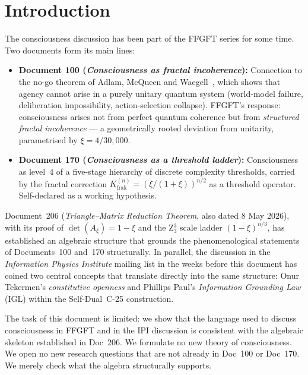 
\section{Introduction}\label{sec:intro}

The consciousness discussion has been part of the FFGFT series for some time. Two documents form its main lines:

\begin{itemize}
\item \textbf{Document 100 (\emph{Consciousness as fractal incoherence}):} Connection to the no-go theorem of Adlam, McQueen and Waegell~\cite{Adlam2025}, which shows that agency cannot arise in a purely unitary quantum system (world-model failure, deliberation impossibility, action-selection collapse). FFGFT's response: consciousness arises not from perfect quantum coherence but from \emph{structured fractal incoherence} --- a geometrically rooted deviation from unitarity, parametrised by $\xi = 4/30{,}000$.
\item \textbf{Document 170 (\emph{Consciousness as a threshold ladder}):} Consciousness as level~4 of a five-stage hierarchy of discrete complexity thresholds, carried by the fractal correction $K_{\text{frak}}^{(n)} = (\xi/(1+\xi))^{n/2}$ as a threshold operator. Self-declared as a working hypothesis.
\end{itemize}

Document~206 (\emph{Triangle--Matrix Reduction Theorem}, also dated 8 May 2026), with its proof of $\det(A_\xi) = 1-\xi$ and the Z$_3^3$ scale ladder $(1-\xi)^{n/3}$, has established an algebraic structure that grounds the phenomenological statements of Documents~100 and~170 structurally. In parallel, the discussion in the \emph{Information Physics Institute} mailing list in the weeks before this document has coined two central concepts that translate directly into the same structure: Onur Tekermen's \emph{constitutive openness} and Phillips Paul's \emph{Information Grounding Law} (IGL) within the Self-Dual~C-25 construction.

\medskip

The task of this document is limited: we show that the language used to discuss consciousness in FFGFT and in the IPI discussion is consistent with the algebraic skeleton established in Doc~206. We formulate no new theory of consciousness. We open no new research questions that are not already in Doc~100 or Doc~170. We merely check what the algebra structurally supports.

